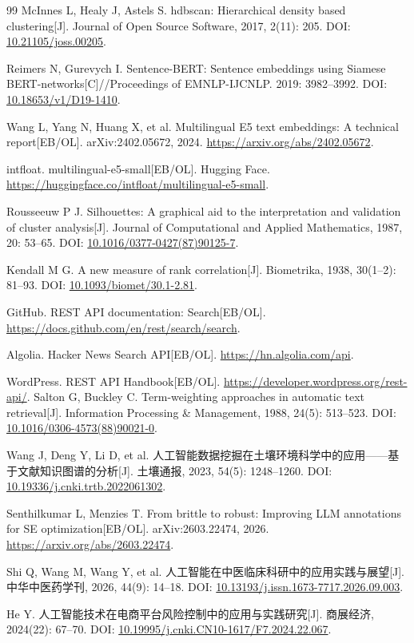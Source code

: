 \begin{thebibliography}{99}
McInnes L, Healy J, Astels S. hdbscan: Hierarchical density based clustering[J]. Journal of Open Source Software, 2017, 2(11): 205. DOI: \href{https://doi.org/10.21105/joss.00205}{10.21105/joss.00205}.

Reimers N, Gurevych I. Sentence-BERT: Sentence embeddings using Siamese BERT-networks[C]//Proceedings of EMNLP-IJCNLP. 2019: 3982--3992. DOI: \href{https://doi.org/10.18653/v1/D19-1410}{10.18653/v1/D19-1410}.

Wang L, Yang N, Huang X, et al. Multilingual E5 text embeddings: A technical report[EB/OL]. arXiv:2402.05672, 2024. \url{https://arxiv.org/abs/2402.05672}.

intfloat. multilingual-e5-small[EB/OL]. Hugging Face. \url{https://huggingface.co/intfloat/multilingual-e5-small}.

Rousseeuw P J. Silhouettes: A graphical aid to the interpretation and validation of cluster analysis[J]. Journal of Computational and Applied Mathematics, 1987, 20: 53--65. DOI: \href{https://doi.org/10.1016/0377-0427(87)90125-7}{10.1016/0377-0427(87)90125-7}.

Kendall M G. A new measure of rank correlation[J]. Biometrika, 1938, 30(1--2): 81--93. DOI: \href{https://doi.org/10.1093/biomet/30.1-2.81}{10.1093/biomet/30.1-2.81}.

GitHub. REST API documentation: Search[EB/OL]. \url{https://docs.github.com/en/rest/search/search}.

Algolia. Hacker News Search API[EB/OL]. \url{https://hn.algolia.com/api}.

WordPress. REST API Handbook[EB/OL]. \url{https://developer.wordpress.org/rest-api/}.
Salton G, Buckley C. Term-weighting approaches in automatic text retrieval[J]. Information Processing \& Management, 1988, 24(5): 513--523. DOI: \href{https://doi.org/10.1016/0306-4573(88)90021-0}{10.1016/0306-4573(88)90021-0}.

Wang J, Deng Y, Li D, et al. 人工智能数据挖掘在土壤环境科学中的应用——基于文献知识图谱的分析[J]. 土壤通报, 2023, 54(5): 1248--1260. DOI: \href{https://doi.org/10.19336/j.cnki.trtb.2022061302}{10.19336/j.cnki.trtb.2022061302}.

Senthilkumar L, Menzies T. From brittle to robust: Improving LLM annotations for SE optimization[EB/OL]. arXiv:2603.22474, 2026. \url{https://arxiv.org/abs/2603.22474}.

Shi Q, Wang M, Wang Y, et al. 人工智能在中医临床科研中的应用实践与展望[J]. 中华中医药学刊, 2026, 44(9): 14--18. DOI: \href{https://doi.org/10.13193/j.issn.1673-7717.2026.09.003}{10.13193/j.issn.1673-7717.2026.09.003}.

He Y. 人工智能技术在电商平台风险控制中的应用与实践研究[J]. 商展经济, 2024(22): 67--70. DOI: \href{https://doi.org/10.19995/j.cnki.CN10-1617/F7.2024.22.067}{10.19995/j.cnki.CN10-1617/F7.2024.22.067}.

\end{thebibliography}
